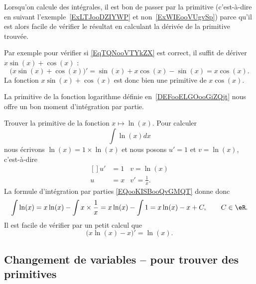 \begin{remark}
    Lorsqu'on calcule des intégrales, il est bon de passer par la primitive (c'est-à-dire en suivant l'exemple~\ref{ExLTJooDZIYWP} et non~\ref{ExWIEooVUgvSp}) parce qu'il est alors facile de vérifier le résultat en calculant la dérivée de la primitive trouvée.

    Par exemple pour vérifier si \eqref{EqTQNooVTYkZX} est correct, il suffit de dériver \( x\sin(x)+\cos(x)\) :
    \begin{equation}
        \big( x\sin(x)+\cos(x) \big)'=\sin(x)+x\cos(x)-\sin(x)=x\cos(x).
    \end{equation}
    La fonction \( x\sin(x)+\cos(x)\) est donc bien une primitive de \( x\cos(x)\).
\end{remark}

\begin{example}\label{primln}
    La primitive de la fonction logarithme définie en~\ref{DEFooELGOooGiZQjt} nous offre un bon moment d'intégration par partie.

    Trouver la primitive de la fonction \( x\mapsto \ln(x)\). Pour calculer
    \begin{equation}
        \int\ln(x)dx
    \end{equation}
    nous écrivons \( \ln(x)=1\times \ln(x)\) et nous posons \( u'=1\) et \( v=\ln(x)\), c'est-à-dire
    \begin{equation}
        \begin{aligned}[]
            u'&=1&v=\ln(x)\\
            u&=x&v'=\frac{1}{ x }.
        \end{aligned}
    \end{equation}
    La formule d'intégration par parties \eqref{EQooKISBooQvGMQT} donne donc
    \begin{equation}
        \int \ln(x)=x\ln(x)-\int x\times \frac{1}{ x }=x\ln(x)-\int 1=x\ln(x)-x+C, \qquad C\in\eR.
    \end{equation}
    Il est facile de vérifier par un petit calcul que
    \begin{equation}
        \big( x\ln(x)-x \big)'=\ln(x).
    \end{equation}
\end{example}


\subsection{Changement de variables -- pour trouver des primitives}

